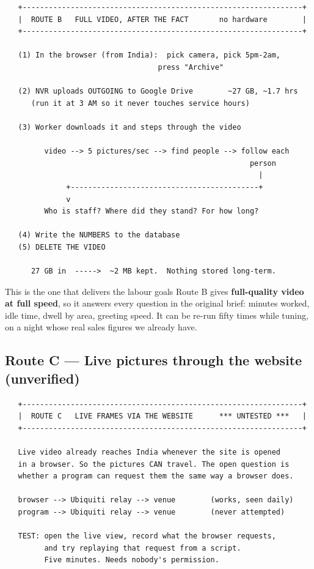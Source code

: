 \documentclass[11pt,a4paper]{article}
\begin{document}
\begin{verbatim}
   +----------------------------------------------------------------+
   |  ROUTE B   FULL VIDEO, AFTER THE FACT       no hardware        |
   +----------------------------------------------------------------+

   (1) In the browser (from India):  pick camera, pick 5pm-2am,
                                   press "Archive"

   (2) NVR uploads OUTGOING to Google Drive        ~27 GB, ~1.7 hrs
      (run it at 3 AM so it never touches service hours)

   (3) Worker downloads it and steps through the video

         video --> 5 pictures/sec --> find people --> follow each
                                                        person
                                                          |
              +-------------------------------------------+
              v
         Who is staff? Where did they stand? For how long?

   (4) Write the NUMBERS to the database
   (5) DELETE THE VIDEO

      27 GB in  ----->  ~2 MB kept.  Nothing stored long-term.
\end{verbatim}

\begin{good}{This is the one that delivers the labour goals}
Route B gives \textbf{full-quality video at full speed}, so it answers
every question in the original brief: minutes worked, idle time, dwell by
area, greeting speed. It can be re-run fifty times while tuning, on a night
whose real sales figures we already have.
\end{good}

\subsection{Route C --- Live pictures through the website (unverified)}

\begin{verbatim}
   +----------------------------------------------------------------+
   |  ROUTE C   LIVE FRAMES VIA THE WEBSITE      *** UNTESTED ***   |
   +----------------------------------------------------------------+

   Live video already reaches India whenever the site is opened
   in a browser. So the pictures CAN travel. The open question is
   whether a program can request them the same way a browser does.

   browser --> Ubiquiti relay --> venue        (works, seen daily)
   program --> Ubiquiti relay --> venue        (never attempted)

   TEST: open the live view, record what the browser requests,
         and try replaying that request from a script.
         Five minutes. Needs nobody's permission.
\end{verbatim}
\end{document}

